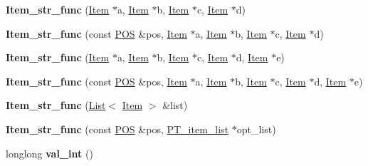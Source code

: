 \begin{DoxyCompactItemize}
\mbox{\label{classItem__str__func_a85b139d7fea72c75fcf4042444f53e1f}} 
{\bfseries Item\+\_\+str\+\_\+func} (\mbox{\hyperlink{classItem}{Item}} $\ast$a, \mbox{\hyperlink{classItem}{Item}} $\ast$b, \mbox{\hyperlink{classItem}{Item}} $\ast$c, \mbox{\hyperlink{classItem}{Item}} $\ast$d)
\item 
\mbox{\label{classItem__str__func_af19f8740845af0c0717bd41080ce16c7}} 
{\bfseries Item\+\_\+str\+\_\+func} (const \mbox{\hyperlink{structYYLTYPE}{P\+OS}} \&pos, \mbox{\hyperlink{classItem}{Item}} $\ast$a, \mbox{\hyperlink{classItem}{Item}} $\ast$b, \mbox{\hyperlink{classItem}{Item}} $\ast$c, \mbox{\hyperlink{classItem}{Item}} $\ast$d)
\item 
\mbox{\label{classItem__str__func_ae624da33076e5e58f7185c712a14a4c1}} 
{\bfseries Item\+\_\+str\+\_\+func} (\mbox{\hyperlink{classItem}{Item}} $\ast$a, \mbox{\hyperlink{classItem}{Item}} $\ast$b, \mbox{\hyperlink{classItem}{Item}} $\ast$c, \mbox{\hyperlink{classItem}{Item}} $\ast$d, \mbox{\hyperlink{classItem}{Item}} $\ast$e)
\item 
\mbox{\label{classItem__str__func_aef4b29618bfb881cfd21c8a95f556fd7}} 
{\bfseries Item\+\_\+str\+\_\+func} (const \mbox{\hyperlink{structYYLTYPE}{P\+OS}} \&pos, \mbox{\hyperlink{classItem}{Item}} $\ast$a, \mbox{\hyperlink{classItem}{Item}} $\ast$b, \mbox{\hyperlink{classItem}{Item}} $\ast$c, \mbox{\hyperlink{classItem}{Item}} $\ast$d, \mbox{\hyperlink{classItem}{Item}} $\ast$e)
\item 
\mbox{\label{classItem__str__func_af7f76d42feb790bac0d568e73f78a893}} 
{\bfseries Item\+\_\+str\+\_\+func} (\mbox{\hyperlink{classList}{List}}$<$ \mbox{\hyperlink{classItem}{Item}} $>$ \&list)
\item 
\mbox{\label{classItem__str__func_a3659a007d26248a194c04009eccabb62}} 
{\bfseries Item\+\_\+str\+\_\+func} (const \mbox{\hyperlink{structYYLTYPE}{P\+OS}} \&pos, \mbox{\hyperlink{classPT__item__list}{P\+T\+\_\+item\+\_\+list}} $\ast$opt\+\_\+list)
\item 
\mbox{\label{classItem__str__func_aea77d14d94a985c923833a580cce0aa5}} 
longlong {\bfseries val\+\_\+int} ()

\end{DoxyCompactItemize}
